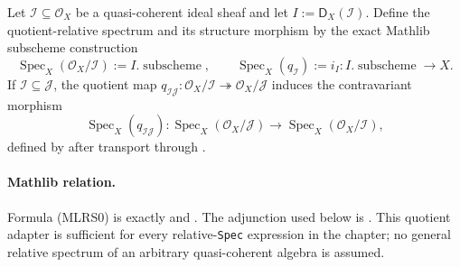 \begin{definition}
  \label{def:nagata-quotient-relative-spec}

  Let $\mathcal I\subseteq\mathcal O_X$ be a quasi-coherent ideal sheaf and
  let $I:=\mathsf D_X(\mathcal I)$.  Define the quotient-relative spectrum
  and its structure morphism by the exact Mathlib subscheme construction
  \[
    \operatorname{Spec}_X(\mathcal O_X/\mathcal I)
      :=I.\operatorname{subscheme},
    \qquad
    \operatorname{Spec}_X(q_{\mathcal I})
      :=i_I\colon
      I.\operatorname{subscheme}\longrightarrow X.              \tag{MLRS0}
  \]
  If $\mathcal I\subseteq\mathcal J$, the quotient map
  $q_{\mathcal I\mathcal J}\colon
    \mathcal O_X/\mathcal I\twoheadrightarrow
    \mathcal O_X/\mathcal J$
  induces the contravariant morphism
  \[
    \operatorname{Spec}_X(q_{\mathcal I\mathcal J})\colon
      \operatorname{Spec}_X(\mathcal O_X/\mathcal J)
        \longrightarrow
      \operatorname{Spec}_X(\mathcal O_X/\mathcal I),            \tag{MLRS1}
  \]
  defined by
  \texttt{} after transport
  through .

  \paragraph{Mathlib relation.}
  Formula (MLRS0) is exactly
  \texttt{} and
  \texttt{}.  The adjunction
  used below is
  \texttt{}.  This
  quotient adapter is sufficient for every relative-\texttt{Spec} expression
  in the chapter; no general relative spectrum of an arbitrary
  quasi-coherent algebra is assumed.
\end{definition}

